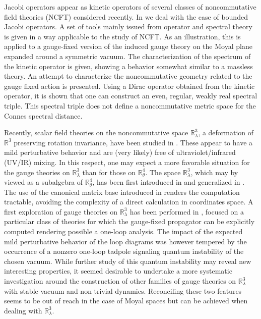 \documentclass[11pt]{book}
\theoremstyle{break}
\begin{document}
Jacobi operators appear as kinetic operators of several classes of noncommutative field theories (NCFT) considered recently. In \cite{GW_2015} we deal with the case of bounded Jacobi operators. A set of tools mainly issued from operator and spectral theory is given in a way applicable to the study of NCFT. As an illustration, this is applied to a gauge-fixed version of the induced gauge theory on the Moyal plane expanded around a symmetric vacuum. The characterization of the spectrum of the kinetic operator is given, showing a behavior somewhat similar to a massless theory. An attempt to characterize the noncommutative geometry related to the gauge fixed action is presented. Using a Dirac operator obtained from the kinetic operator, it is shown that one can construct an even, regular, weakly real spectral triple. This spectral triple does not define a noncommutative metric space for the Connes spectral distance.\par%


Recently, scalar field theories on the noncommutative space $\mathbb{R}^3_\lambda$, a deformation of $\mathbb{R}^3$ preserving rotation invariance, have been studied in \cite{VW_2013}. These appear  to have a mild perturbative behavior and are (very likely) free of ultraviolet/infrared (UV/IR) mixing. In this respect, one may expect a more favorable situation for the gauge theories on $\mathbb{R}^3_\lambda$ than for those on $\mathbb{R}^4_\theta$. The space $\mathbb{R}^3_\lambda$, which may by viewed as a subalgebra of $\mathbb{R}^4_\theta$,  has been first introduced in \cite{HLSJ_2002} and generalized in \cite{GBLMV_2002}. The use of the canonical matrix base introduced in \cite{VW_2013} renders the computation tractable, avoiding the complexity of a direct calculation in coordinates space. A first exploration of gauge theories on $\mathbb{R}^3_\lambda$ has been performed in \cite{GVW_2014}, focused on a particular class of theories for which the gauge-fixed propagator can be explicitly computed rendering possible a one-loop analysis. The impact of the expected mild perturbative behavior of the loop diagrams was however tempered by the occurrence of a nonzero one-loop tadpole signaling quantum instability of the chosen vacuum. While further study of this quantum instability may reveal new interesting properties, it seemed desirable to undertake a more systematic investigation around the construction of other families of gauge theories on $\mathbb{R}^3_\lambda$ with stable vacuum and non trivial dynamics. Reconciling these two features seems to be out of reach in the case of Moyal spaces but can be achieved when dealing with $\mathbb{R}^3_\lambda$.\par%
\end{document}
